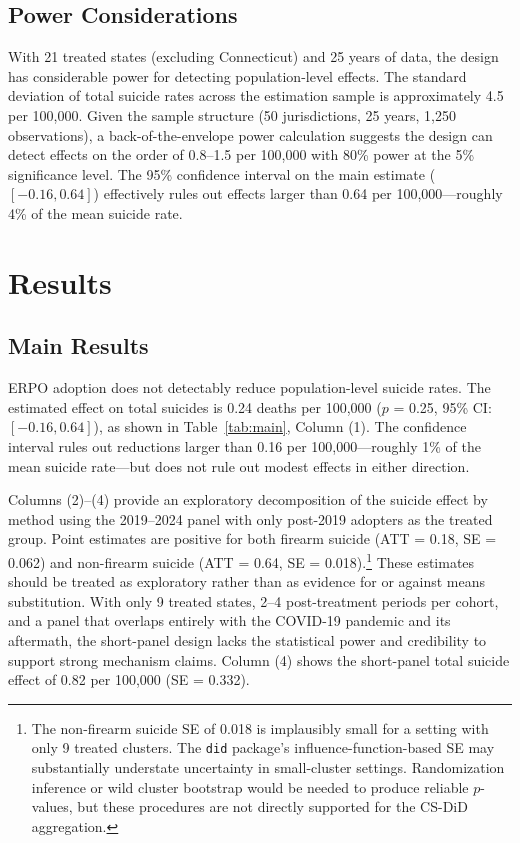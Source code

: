 \documentclass[12pt]{article}
\begin{document}
\subsection{Power Considerations}

With 21 treated states (excluding Connecticut) and 25 years of data, the design has considerable power for detecting population-level effects. The standard deviation of total suicide rates across the estimation sample is approximately 4.5 per 100,000. Given the sample structure (50 jurisdictions, 25 years, 1,250 observations), a back-of-the-envelope power calculation suggests the design can detect effects on the order of 0.8--1.5 per 100,000 with 80\% power at the 5\% significance level. The 95\% confidence interval on the main estimate ($[-0.16, 0.64]$) effectively rules out effects larger than 0.64 per 100,000---roughly 4\% of the mean suicide rate.


\section{Results}

\subsection{Main Results}

ERPO adoption does not detectably reduce population-level suicide rates. The estimated effect on total suicides is 0.24 deaths per 100,000 ($p$ = 0.25, 95\% CI: $[-0.16, 0.64]$), as shown in Table~\ref{tab:main}, Column (1). The confidence interval rules out reductions larger than 0.16 per 100,000---roughly 1\% of the mean suicide rate---but does not rule out modest effects in either direction.

Columns (2)--(4) provide an exploratory decomposition of the suicide effect by method using the 2019--2024 panel with only post-2019 adopters as the treated group. Point estimates are positive for both firearm suicide (ATT = 0.18, SE = 0.062) and non-firearm suicide (ATT = 0.64, SE = 0.018).\footnote{The non-firearm suicide SE of 0.018 is implausibly small for a setting with only 9 treated clusters. The \texttt{did} package's influence-function-based SE may substantially understate uncertainty in small-cluster settings. Randomization inference or wild cluster bootstrap would be needed to produce reliable $p$-values, but these procedures are not directly supported for the CS-DiD aggregation.} These estimates should be treated as exploratory rather than as evidence for or against means substitution. With only 9 treated states, 2--4 post-treatment periods per cohort, and a panel that overlaps entirely with the COVID-19 pandemic and its aftermath, the short-panel design lacks the statistical power and credibility to support strong mechanism claims. Column (4) shows the short-panel total suicide effect of 0.82 per 100,000 (SE = 0.332).
\end{document}
